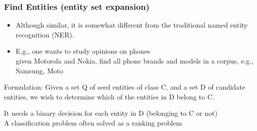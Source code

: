 \documentclass[t]{beamer}
\begin{document}
\begin{frame} \frametitle{Find Entities (entity set expansion)} %

\begin{itemize}
\item Although similar, it is somewhat different from the traditional named entity recognition (NER).
\item E.g., one wants to study opinions on phones \\
given Motorola and Nokia, find all phone brands and models in a corpus, e.g., Samsung, Moto
\end{itemize}

\begin{block}{Formulation:} 
Given a set Q of seed entities of class C, and a set D of candidate entities, we wish to determine which of the entities in D belong to C.
\end{block}

It needs a binary decision for each entity
in D (belonging to C or not) \\
A classification problem  often solved as a ranking problem

\end{frame}

\end{document}
